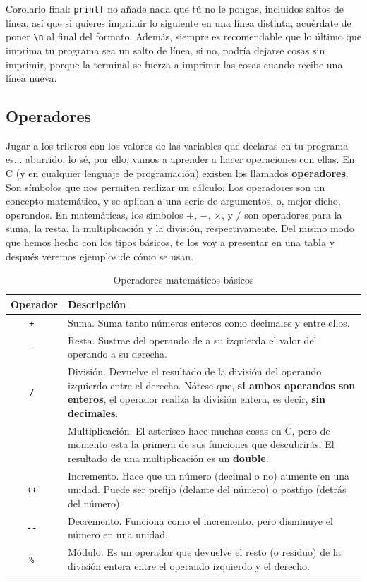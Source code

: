 \documentclass[a4paper]{article}
\begin{document}
Corolario final: \texttt{printf} no añade nada que tú no le pongas, incluidos
saltos de línea, así que si quieres imprimir lo siguiente en una línea distinta,
acuérdate de poner \verb!\n! al final del formato. Además, siempre es
recomendable que lo último que imprima tu programa sea un salto de línea, si no,
podría dejarse cosas sin imprimir, porque la terminal se fuerza a imprimir las
cosas cuando recibe una línea nueva.

\subsection{Operadores}
Jugar a los trileros con los valores de las variables que declaras en
tu programa es... aburrido, lo sé, por ello, vamos a aprender a hacer
operaciones con ellas.
En C (y en cualquier lenguaje de programación) existen los llamados
\textbf{operadores}. Son símbolos que nos permiten realizar un cálculo.
Los operadores son un concepto matemático, y se aplican a una
serie de argumentos, o, mejor dicho, operandos. En
matemáticas, los símbolos $+$, $-$, $\times$, y $/$ son
operadores para la suma, la resta, la multiplicación y la división,
respectivamente.
Del mismo modo que hemos hecho con los tipos básicos, te los
voy a presentar en una tabla y después veremos ejemplos de cómo se usan.

\begin{table}[H]
\centering
\begin{tabularx}{\linewidth}{|c|Y|}
\hline
\bf Operador & \bf Descripción \\ \hline
\tt + & Suma. Suma tanto números enteros como decimales y entre ellos. \\\hline
\tt - & Resta. Sustrae del operando de a su izquierda el valor del operando a su derecha. \\\hline
\tt / & División. Devuelve el resultado de la división del operando izquierdo entre el derecho. Nótese que, \textbf{si ambos operandos son enteros}, el operador realiza la división entera, es decir, \textbf{sin decimales}. \\\hline
\tt * & Multiplicación. El asterisco hace muchas cosas en C, pero de momento esta la primera de sus funciones que descubrirás. El resultado de una multiplicación es un \textbf{double}.\\\hline
\tt ++ & Incremento. Hace que un número (decimal o no) aumente en una unidad. Puede ser prefijo (delante del número) o postfijo (detrás del número). \\\hline
\tt -{}- & Decremento. Funciona como el incremento, pero disminuye el número en una unidad. \\\hline
\tt \% & Módulo. Es un operador que devuelve el resto (o residuo) de la división entera entre el operando izquierdo y el derecho. \\\hline
\end{tabularx}
\caption{Operadores matemáticos básicos}
\label{tab:mathOperators}
\end{table}
\end{document}
